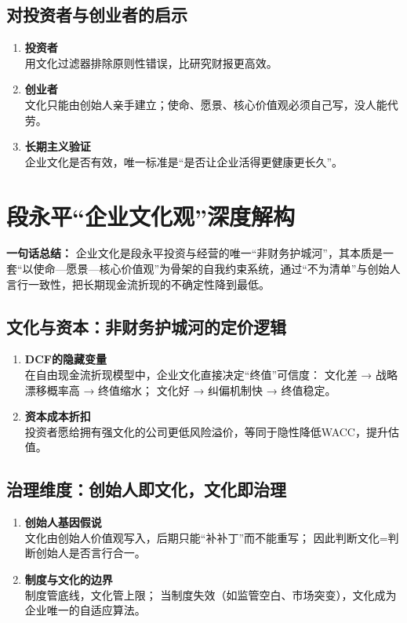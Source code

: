 \subsection{对投资者与创业者的启示}
\begin{enumerate}[leftmargin=*, nosep]
    \item \textbf{投资者}  \\
    用文化过滤器排除原则性错误，比研究财报更高效。
    \item \textbf{创业者}  \\
    文化只能由创始人亲手建立；使命、愿景、核心价值观必须自己写，没人能代劳。
    \item \textbf{长期主义验证}  \\
    企业文化是否有效，唯一标准是“是否让企业活得更健康更长久”。
\end{enumerate}


\section{段永平“企业文化观”深度解构}
\textbf{一句话总结：}  
企业文化是段永平投资与经营的唯一“非财务护城河”，其本质是一套“以使命—愿景—核心价值观”为骨架的自我约束系统，通过“不为清单”与创始人言行一致性，把长期现金流折现的不确定性降到最低。

\subsection{文化与资本：非财务护城河的定价逻辑}
\begin{enumerate}[leftmargin=*, nosep]
    \item \textbf{DCF的隐藏变量}  \\
    在自由现金流折现模型中，企业文化直接决定“终值”可信度：  
    文化差 → 战略漂移概率高 → 终值缩水；  
    文化好 → 纠偏机制快 → 终值稳定。
    \item \textbf{资本成本折扣}  \\
    投资者愿给拥有强文化的公司更低风险溢价，等同于隐性降低WACC，提升估值。
\end{enumerate}

\subsection{治理维度：创始人即文化，文化即治理}
\begin{enumerate}[leftmargin=*, nosep]
    \item \textbf{创始人基因假说}  \\
    文化由创始人价值观写入，后期只能“补补丁”而不能重写；  
    因此判断文化=判断创始人是否言行合一。
    \item \textbf{制度与文化的边界}\\  
    制度管底线，文化管上限；  
    当制度失效（如监管空白、市场突变），文化成为企业唯一的自适应算法。
\end{enumerate}

